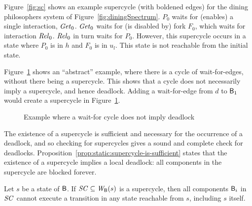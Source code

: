 Figure~\ref{fig:sc} shows an example supercycle (with boldened edges) for the dining philosophers
system of Figure~\ref{fig:diningSpectrum}.
$P_0$ waits for (enables) a single interaction, $\mathit{Get}_0$. 
$\mathit{Get}_0$ waits for (is disabled by) fork $F_0$, which waits for interaction $\mathit{Rel}_0$.
$\mathit{Rel}_0$ in turn waits for $P_0$. However, this supercycle occurs in a state where $P_0$ is in $h$
and $F_0$ is in $u_l$. This state is not reachable from the initial state. 



Figure~\ref{fig:cycleOK} shows an ``abstract'' example, where there is
a cycle of wait-for-edges, without there being a supercycle. This shows
that a cycle does not necessarily imply a supercycle, and hence
deadlock. Adding a wait-for-edge from $d$ to $\mathsf{B}_1$ would create a
supercycle in Figure~\ref{fig:cycleOK}.
%
\begin{figure}[ht]
\begin{center}
\scalebox{0.5}{}
\caption{Example where a wait-for cycle does not imply deadlock}
\label{fig:cycleOK}
\end{center}
\end{figure}






The existence of a supercycle is sufficient and necessary for the occurrence of
a deadlock, and so checking for supercycles gives a sound and complete check for
deadlocks.  
%
Proposition~\ref{prop:static:supercycle-is-sufficient} states that the
existence of a supercycle implies a local deadlock: all components in
the supercycle are blocked forever.

\bp
\label{prop:static:supercycle-is-sufficient}
Let $s$ be a state of $\mathsf{B}$.
If $\mathit{SC} \subseteq \mathit{W}_{\mathsf{B}}({s})$ is a supercycle, then all components $\mathsf{B}_i$ in $\mathit{SC}$ cannot execute a transition in any state reachable
from $s$, including $s$ itself.
\ep
%

